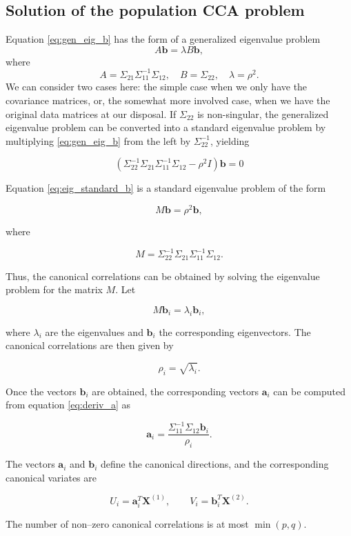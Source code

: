 \subsection{Solution of the population CCA problem}
Equation \eqref{eq:gen_eig_b} has the form of a generalized eigenvalue problem
\[
A\mathbf{b} = \lambda B\mathbf{b},
\]
where
\[
A = \Sigma_{21}\Sigma_{11}^{-1}\Sigma_{12}, \quad
B = \Sigma_{22}, \quad
\lambda = \rho^2.
\]
We can consider two cases here: the simple case when we only have the covariance matrices, or, the somewhat more involved case, when we have the original data matrices at our disposal.
If $\Sigma_{22}$ is non-singular, the generalized eigenvalue problem
can be converted into a standard eigenvalue problem by multiplying
\eqref{eq:gen_eig_b} from the left by $\Sigma_{22}^{-1}$, yielding

\begin{equation} \label{eq:eig_standard_b}
    (\Sigma_{22}^{-1} \Sigma_{21} \Sigma_{11}^{-1} \Sigma_{12} - \rho^2 I)\mathbf{b} = 0
\end{equation}

Equation \eqref{eq:eig_standard_b} is a standard eigenvalue problem of the form

\[
M \mathbf{b} = \rho^2 \mathbf{b},
\]

where

\[
M = \Sigma_{22}^{-1} \Sigma_{21} \Sigma_{11}^{-1} \Sigma_{12}.
\]

Thus, the canonical correlations can be obtained by solving the
eigenvalue problem for the matrix $M$. Let

\[
M \mathbf{b}_i = \lambda_i \mathbf{b}_i ,
\]

where $\lambda_i$ are the eigenvalues and $\mathbf{b}_i$ the corresponding
eigenvectors. The canonical correlations are then given by

\[
\rho_i = \sqrt{\lambda_i}.
\]

Once the vectors $\mathbf{b}_i$ are obtained, the corresponding vectors
$\mathbf{a}_i$ can be computed from equation \eqref{eq:deriv_a} as

\[
\mathbf{a}_i =
\frac{\Sigma_{11}^{-1} \Sigma_{12} \mathbf{b}_i}{\rho_i}.
\]

The vectors $\mathbf{a}_i$ and $\mathbf{b}_i$ define the canonical
directions, and the corresponding canonical variates are

\[
U_i = \mathbf{a}_i^T \mathbf{X}^{(1)}, \qquad
V_i = \mathbf{b}_i^T \mathbf{X}^{(2)} .
\]

The number of non–zero canonical correlations is at most
$\min(p,q)$.

